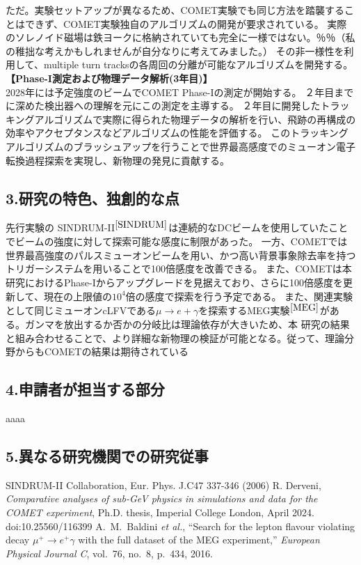 \documentclass[11pt,a4j,dvipdfmx]{jarticle} 					%
\newcommand{\研究課題名}{ミューオン電子転換探索の感度向上に向けた解析手法の開発}
\newcommand{\研究機関名}{大阪大学}
\newcommand{\研究代表者氏名}{高見 翔太   }
\newcommand{\mysubsection}[1]{\vspace{-20pt}\subsection*{\colorbox{cyan!15}{\normalsize{#1}}}\vspace{-0.2cm}}
\begin{document}
ただ。実験セットアップが異なるため、COMET実験でも同じ方法を踏襲することはできず、COMET実験独自のアルゴリズムの開発が要求されている。
実際のソレノイド磁場は鉄ヨークに格納されていても完全に一様ではない。％％（私の稚拙な考えかもしれませんが自分なりに考えてみました。）
その非一様性を利用して、multiple turn tracksの各周回の分離が可能なアルゴリズムを開発する。
\\
\textbf{【Phase-I測定および物理データ解析(3年目)】}\\
2028年には予定強度のビームでCOMET Phase-Iの測定が開始する。
２年目までに深めた検出器への理解を元にこの測定を主導する。
２年目に開発したトラッキングアルゴリズムで実際に得られた物理データの解析を行い、飛跡の再構成の効率やアクセプタンスなどアルゴリズムの性能を評価する。
このトラッキングアルゴリズムのブラッシュアップを行うことで世界最高感度でのミューオン電子転換過程探索を実現し、新物理の発見に貢献する。

\mysubsection{3.研究の特色、独創的な点}
先行実験の SINDRUM-I\hspace{-1.2pt}I$^{\cite{SINDRUM}}$は連続的なDCビームを使用していたことでビームの強度に対して探索可能な感度に制限があった。
一方、COMETでは世界最高強度のパルスミューオンビームを用い、かつ高い背景事象除去率を持つトリガーシステムを用いることで100倍感度を改善できる。
また、COMETは本研究におけるPhase-Iからアップグレードを見据えており、さらに100倍感度を更新して、現在の上限値の$10^4$倍の感度で探索を行う予定である。
また、関連実験として同じミューオンcLFVである$\mu \rightarrow e + \gamma$を探索するMEG実験$^{\cite{MEG}}$がある。ガンマを放出するか否かの分岐比は理論依存が大きいため、本
研究の結果と組み合わせることで、より詳細な新物理の検証が可能となる。従って、理論分野からもCOMETの結果は期待されている\\
\mysubsection{4.申請者が担当する部分}
aaaa
\mysubsection{5.異なる研究機関での研究従事}
\small
\begin{thebibliography}{99}
	 SINDRUM-II Collaboration, Eur. Phys. J.C47 337-346 (2006)
  R. Derveni, 
  \emph{Comparative analyses of sub-GeV physics in simulations and data for the COMET experiment},  
  Ph.D. thesis, Imperial College London, April 2024.  
	{doi:10.25560/116399}
	A.~M.~Baldini \textit{et al.}, ``Search for the lepton flavour violating decay $\mu^+ \to e^+ \gamma$ with the full dataset of the MEG experiment,'' \textit{European Physical Journal C}, vol.~76, no.~8, p.~434, 2016. 
\end{thebibliography}
\end{document}
